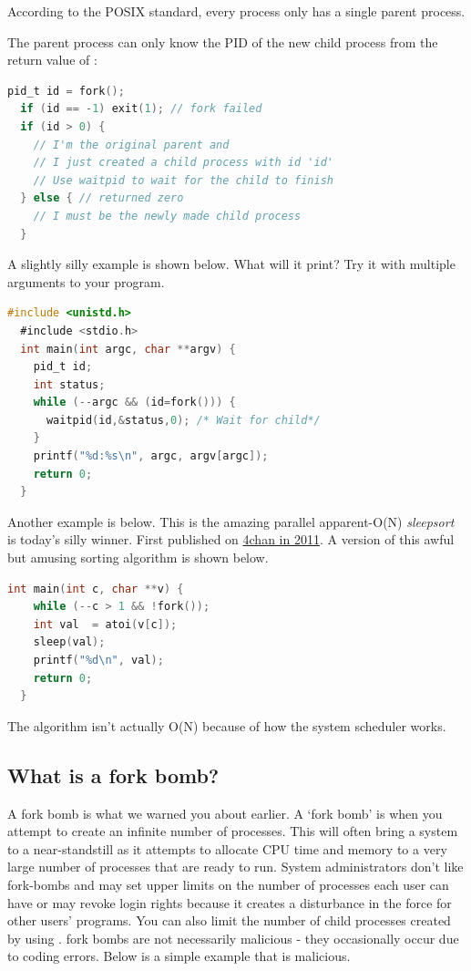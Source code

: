\begin{itemize}
\begin{itemize}
According to the POSIX standard, every process only has a single parent process.

The parent process can only know the PID of the new child process from the return value of :

\begin{lstlisting}[language=C]
  pid_t id = fork();
  if (id == -1) exit(1); // fork failed
  if (id > 0) {
    // I'm the original parent and
    // I just created a child process with id 'id'
    // Use waitpid to wait for the child to finish
  } else { // returned zero
    // I must be the newly made child process
  }
\end{lstlisting}

A slightly silly example is shown below. What will it print? Try it with multiple arguments to your program.

\begin{lstlisting}[language=C]
  #include <unistd.h>
  #include <stdio.h>
  int main(int argc, char **argv) {
    pid_t id;
    int status;
    while (--argc && (id=fork())) {
      waitpid(id,&status,0); /* Wait for child*/
    }
    printf("%d:%s\n", argc, argv[argc]);
    return 0;
  }
\end{lstlisting}

Another example is below.
This is the amazing parallel apparent-O(N) \emph{sleepsort} is today's silly winner. First published on \href{https://dis.4chan.org/read/prog/1295544154}{4chan in 2011}. A version of this awful but amusing sorting algorithm is shown below.

\begin{lstlisting}[language=C]
  int main(int c, char **v) {
    while (--c > 1 && !fork());
    int val  = atoi(v[c]);
    sleep(val);
    printf("%d\n", val);
    return 0;
  }
\end{lstlisting}

The algorithm isn't actually O(N) because of how the system scheduler works.

\subsection{What is a fork bomb?}

A fork bomb is what we warned you about earlier.
A `fork bomb' is when you attempt to create an infinite number of processes.
This will often bring a system to a near-standstill as it attempts to allocate CPU time and memory to a very large number of processes that are ready to run.
System administrators don't like fork-bombs and may set upper limits on the number of processes each user can have or may revoke login rights because it creates a disturbance in the force for other users' programs.
You can also limit the number of child processes created by using . fork bombs are not necessarily malicious - they occasionally occur due to coding errors.
Below is a simple example that is malicious.


\end{itemize}
\end{itemize}
